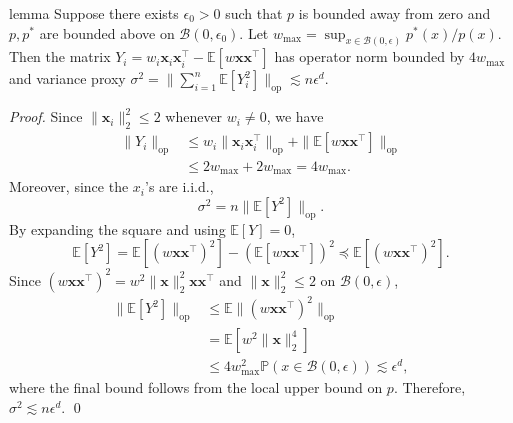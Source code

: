 \documentclass[11pt]{article}
\begin{document}
\begin{appendices}
\begin{restatable}{lemma}{}\label{lemma: operator norm and var proxy}
    Suppose there exists $\epsilon_0>0$ such that $p$ is bounded away from zero and $p,p^*$ are bounded above on $\mathcal{B}(0,\epsilon_0)$. Let $w_{\max} = \sup_{x \in \mathcal{B}(0, \epsilon)}p^*(x)/p(x)$. Then the matrix $Y_i = w_i\boldsymbol{x}_i\boldsymbol{x}_i^{\top} - \mathbb{E}[w\boldsymbol{x}\boldsymbol{x}^{\top}]$ has operator norm bounded by $4w_{\max}$ and variance proxy $\sigma^2 = \|\sum_{i = 1}^n \mathbb{E}[Y_i^2]\|_{\operatorname{op}} \lesssim n\epsilon^d$.
\end{restatable} 
\noindent \textit{Proof.} Since $\|\boldsymbol{x}_i\|_2^2\leq2$ whenever $w_i\neq0$, we have
\begin{align*}
    \|Y_i\|_{\operatorname{op}}
    &\leq w_i\|\boldsymbol{x}_i\boldsymbol{x}_i^{\top}\|_{\operatorname{op}}
    +\|\mathbb{E}[w\boldsymbol{x}\boldsymbol{x}^{\top}]\|_{\operatorname{op}} \\
    &\leq 2w_{\max}+2w_{\max}
    =4w_{\max}.
\end{align*}
Moreover, since the $x_i$'s are i.i.d.,
\[
    \sigma^2=n\|\mathbb{E}[Y^2]\|_{\operatorname{op}}.
\]
By expanding the square and using $\mathbb{E}[Y]=0$,
\[
    \mathbb{E}[Y^2]
    =
    \mathbb{E}[(w\boldsymbol{x}\boldsymbol{x}^{\top})^2]
    -
    \left(\mathbb{E}[w\boldsymbol{x}\boldsymbol{x}^{\top}]\right)^2
    \preceq
    \mathbb{E}[(w\boldsymbol{x}\boldsymbol{x}^{\top})^2].
\]
Since $(w\boldsymbol{x}\boldsymbol{x}^{\top})^2=w^2\|\boldsymbol{x}\|_2^2\boldsymbol{x}\boldsymbol{x}^{\top}$ and $\|\boldsymbol{x}\|_2^2\leq2$ on $\mathcal{B}(0,\epsilon)$,
\begin{align*}
    \|\mathbb{E}[Y^2]\|_{\operatorname{op}}
    &\leq \mathbb{E}\|(w\boldsymbol{x}\boldsymbol{x}^{\top})^2\|_{\operatorname{op}} \\
    &= \mathbb{E}[w^2\|\boldsymbol{x}\|_2^4] \\
    &\leq 4w_{\max}^2\mathbb{P}(x\in\mathcal{B}(0,\epsilon))
    \lesssim \epsilon^d,
\end{align*}
where the final bound follows from the local upper bound on $p$. Therefore, $\sigma^2\lesssim n\epsilon^d$.
\qed{}


\end{appendices}
\end{document}
